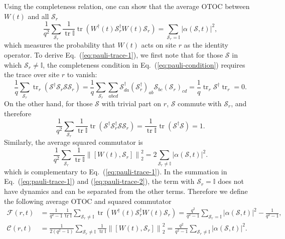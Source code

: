 \documentclass[aps,prb,superscriptaddress,nofootinbib]{revtex4}
\def \tr{\operatorname{tr}}
\begin{document}
Using the completeness relation, one can show that the average OTOC between $W(t)$ and all $\mathcal{S}_r$
\begin{equation}\label{eq:pauli-trace-1}
	\frac{1}{q^2} \sum_{\mathcal{S}_r} \frac{1}{\operatorname{tr} \mathbb I} \operatorname{tr}\left(W^{\dagger}(t) \mathcal{S}_r^{\dagger} W(t) \mathcal{S}_r\right)
	=\sum_{\mathcal{S}_r=\mathbb I}|\alpha(\mathcal{S}, t)|^2,
\end{equation}
which measures the probability that $W(t)$ acts on site $r$ as the identity operator.
To derive Eq.~(\ref{eq:pauli-trace-1}), we first note that for those $\mathcal S$ in which $\mathcal S_r \ne \mathbb I$, the completeness condition in Eq.~(\ref{eq:pauli-condition}) requires the trace over site $r$ to vanish:
\begin{equation}
	\frac{1}{q}\sum_{\mathcal S_r}\tr_r(\mathcal S^\dagger \mathcal S_r \mathcal S \mathcal S_r)
	= \frac{1}{q}\sum_{\mathcal S_r} \sum_{abcd} \mathcal S^\dagger_{da} (\mathcal S_r^\dagger)_{ab} \mathcal S_{bc} (\mathcal S_r)_{cd}
	=\frac{1}{q}\tr_r \mathcal S^\dagger \tr_r \mathcal  = 0.
\end{equation}
On the other hand, for those $\mathcal S$ with trivial part on $r$, $\mathcal S$ commute with $\mathcal S_r$, and therefore
\begin{equation}
	\frac{1}{q^2} \sum_{\mathcal{S}_r} \frac{1}{\operatorname{tr} \mathbb I} \operatorname{tr}\left(\mathcal S^{\dagger} \mathcal{S}_r^{\dagger} \mathcal S \mathcal{S}_r\right)
	= \frac{1}{\operatorname{tr} \mathbb I} \operatorname{tr}\left(\mathcal S^{\dagger} \mathcal S\right) = 1.
\end{equation}
Similarly, the average squared commutator is
\begin{equation}\label{eq:pauli-trace-2}
	\frac{1}{q^2} \sum_{\mathcal{S}_r} \frac{1}{\operatorname{tr} \mathbb I}\left\|\left[W(t), \mathcal{S}_r\right]\right\|_2^2
	=2 \sum_{\mathcal{S}_r \neq \mathbb I}|\alpha(\mathcal{S}, t)|^2.
\end{equation}
which is complementary to Eq.~(\ref{eq:pauli-trace-1}). 
In the summation in Eq.~(\ref{eq:pauli-trace-1}) and (\ref{eq:pauli-trace-2}), the term with $\mathcal{S}_r= \mathbb I$ does not have dynamics and can be separated from the other terms.
Therefore we define the following average OTOC and squared commutator
\begin{equation}
\begin{aligned}
	\mathcal{F}(r, t) & =\frac{1}{q^2-1} \frac{1}{\operatorname{tr} \mathbb I} \sum_{\mathcal{S}_r \neq \mathbb I} \operatorname{tr}\left(W^{\dagger}(t) \mathcal{S}_r^{\dagger} W(t) \mathcal{S}_r\right) 
	=\frac{q^2}{q^2-1} \sum_{\mathcal{S}_r= \mathbb I}|\alpha(\mathcal{S}, t)|^2-\frac{1}{q^2-1}, \\
	\mathcal{C}(r, t) & =\frac{1}{2(q^2-1)} \sum_{\mathcal{S}_r \neq \mathbb I} \frac{1}{\operatorname{tr} \mathbb I}\left\|\left[W(t), \mathcal{S}_r\right]\right\|_2^2
	=\frac{q^2}{q^2-1} \sum_{\mathcal{S}_r \neq \mathbb I}|\alpha(\mathcal{S}, t)|^2 .
\end{aligned}
\end{equation}
\end{document}
